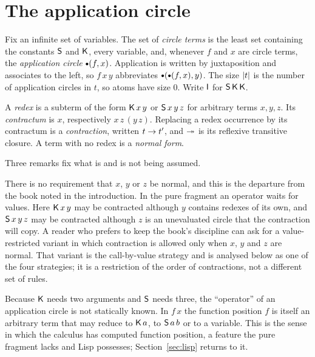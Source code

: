 \section{The application circle}\label{sec:application}

\begin{definition}\label{def:terms}
Fix an infinite set of variables. The set of \emph{circle terms} is the least set containing the constants $\mathsf{S}$ and $\mathsf{K}$, every variable, and, whenever $f$ and $x$ are circle terms, the \emph{application circle} $\App(f,x)$. Application is written by juxtaposition and associates to the left, so $f\,x\,y$ abbreviates $\App(\App(f,x),y)$. The size $\lvert t\rvert$ is the number of application circles in $t$, so atoms have size $0$. Write $\mathsf{I}$ for $\mathsf{S}\,\mathsf{K}\,\mathsf{K}$.
\end{definition}

\begin{definition}[Contraction]\label{def:contraction}
A \emph{redex} is a subterm of the form $\mathsf{K}\,x\,y$ or $\mathsf{S}\,x\,y\,z$ for arbitrary terms $x,y,z$. Its \emph{contractum} is $x$, respectively $x\,z\,(y\,z)$. Replacing a redex occurrence by its contractum is a \emph{contraction}, written $t\rightarrow t'$, and $\twoheadrightarrow$ is its reflexive transitive closure. A term with no redex is a \emph{normal form}.
\end{definition}

Three remarks fix what is and is not being assumed.

\begin{remark}
There is no requirement that $x$, $y$ or $z$ be normal, and this is the departure from the book noted in the introduction. In the pure fragment an operator waits for values. Here $\mathsf{K}\,x\,y$ may be contracted although $y$ contains redexes of its own, and $\mathsf{S}\,x\,y\,z$ may be contracted although $z$ is an unevaluated circle that the contraction will copy. A reader who prefers to keep the book's discipline can ask for a value-restricted variant in which contraction is allowed only when $x$, $y$ and $z$ are normal. That variant is the call-by-value strategy and is analysed below as one of the four strategies; it is a restriction of the order of contractions, not a different set of rules.
\end{remark}

\begin{remark}
Because $\mathsf{K}$ needs two arguments and $\mathsf{S}$ needs three, the ``operator'' of an application circle is not statically known. In $f\,x$ the function position $f$ is itself an arbitrary term that may reduce to $\mathsf{K}\,a$, to $\mathsf{S}\,a\,b$ or to a variable. This is the sense in which the calculus has computed function position, a feature the pure fragment lacks and Lisp possesses; Section~\ref{sec:lisp} returns to it.
\end{remark}

